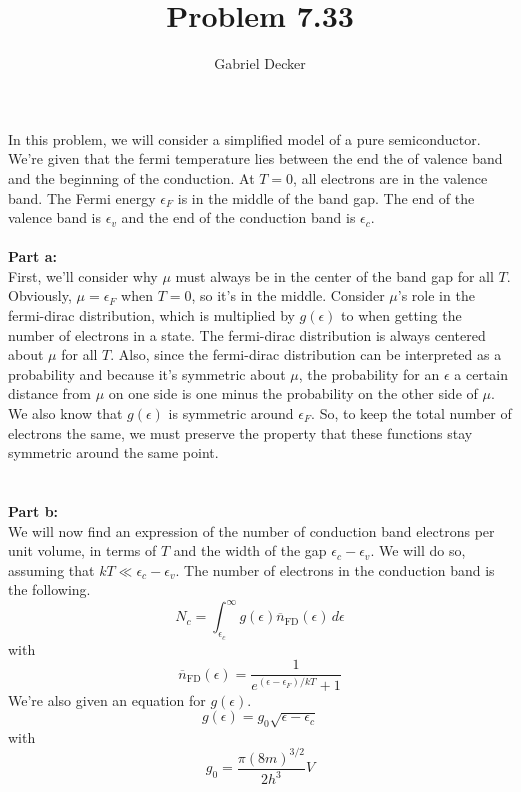 \documentclass[12pt]{article}
\title{Problem 7.33}
\author{Gabriel Decker}
\begin{document}
\maketitle
\begin{flushleft}


In this problem, we will consider a simplified model of a pure semiconductor.
We're given that the fermi temperature lies between the end the of valence band and the beginning of the conduction.
At $T=0$, all electrons are in the valence band.
The Fermi energy $\epsilon_F$ is in the middle of the band gap.
The end of the valence band is $\epsilon_v$ and the end of the conduction band is $\epsilon_c$.\\~\\

\textbf{Part a:}\\
First, we'll consider why $\mu$ must always be in the center of the band gap for all $T$.
Obviously, $\mu=\epsilon_F$ when $T=0$, so it's in the middle.
Consider $\mu$'s role in the fermi-dirac distribution, which is multiplied by $g(\epsilon)$ to when getting the number of electrons in a state.
The fermi-dirac distribution is always centered about $\mu$ for all $T$.
Also, since the fermi-dirac distribution can be interpreted as a probability and because it's symmetric about $\mu$, the probability for an $\epsilon$ a certain distance from $\mu$ on one side is one minus the probability on the other side of $\mu$.
We also know that $g(\epsilon)$ is symmetric around $\epsilon_F$.
So, to keep the total number of electrons the same, we must preserve the property that these functions stay symmetric around the same point.\\~\\~\\

\textbf{Part b:}\\
We will now find an expression of the number of conduction band electrons per unit volume, in terms of $T$ and the width of the gap $\epsilon_c-\epsilon_v$.
We will do so, assuming that $kT\ll\epsilon_c-\epsilon_v$.
The number of electrons in the conduction band is the following.
\begin{equation}
    N_c=\int_{\epsilon_c}^{\infty}g(\epsilon)\overline{n}_\text{FD}(\epsilon)\,d\epsilon
\end{equation}
with
\begin{equation}
    \overline{n}_\text{FD}(\epsilon)=\frac{1}{e^{(\epsilon-\epsilon_F)/kT}+1}
\end{equation}
We're also given an equation for $g(\epsilon)$.
\begin{equation}
    g(\epsilon)=g_0\sqrt{\epsilon-\epsilon_c}
\end{equation}
with
\begin{equation}
    g_0=\frac{\pi(8m)^{3/2}}{2h^3}V
\end{equation}\\~\\


\end{flushleft}
\end{document}
